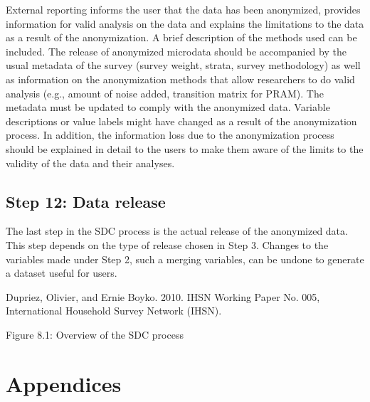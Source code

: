 \documentclass[letterpaper,10pt,english]{sphinxmanual}
\begin{document}
External reporting informs the user that the data has been anonymized,
provides information for valid analysis on the data and explains the
limitations to the data as a result of the anonymization. A brief
description of the methods used can be included. The release of
anonymized microdata should be accompanied by the usual metadata of the
survey (survey weight, strata, survey methodology) as well as
information on the anonymization methods that allow researchers to do
valid analysis (e.g., amount of noise added, transition matrix for
PRAM).  The
metadata must be updated to comply with the anonymized data. Variable
descriptions or value labels might have changed as a result of the
anonymization process. In addition, the information loss due to the
anonymization process should be explained in detail to the users to make
them aware of the limits to the validity of the data and their analyses.


\section{Step 12: Data release}
\label{\detokenize{process:step-12-data-release}}
The last step in the SDC process is the actual release of the anonymized
data. This step depends on the type of release chosen in Step 3. Changes
to the variables made under Step 2, such a merging variables, can be
undone to generate a dataset useful for users.


Dupriez, Olivier, and Ernie Boyko. 2010.  IHSN Working Paper No.
005, International Household Survey Network (IHSN).

\noindent{}

Figure 8.1: Overview of the SDC process


\chapter{Appendices}
\label{\detokenize{appendices:appendices}}\label{\detokenize{appendices::doc}}

\section{ }
\label{\detokenize{appendices:appendix-a-overview-of-case-study-variables}}
\end{document}

